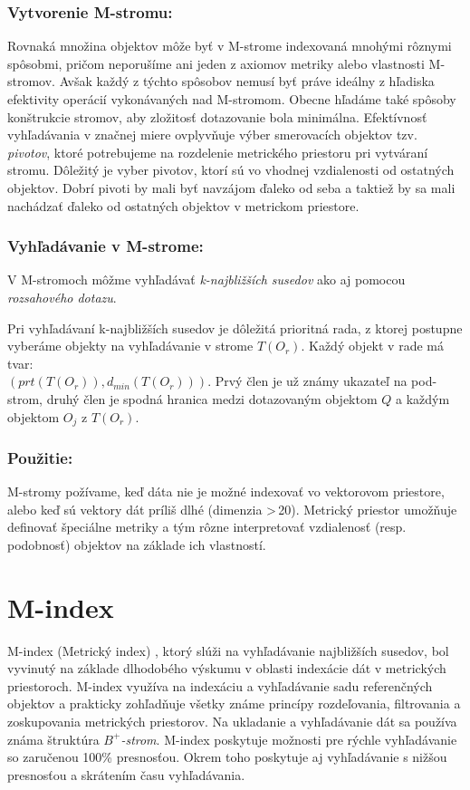 \documentclass[12pt,a4paper,oneside]{fithesis2}
\begin{document}
\subsection{Vytvorenie M-stromu:}
Rovnaká množina objektov môže byť v M-strome indexovaná mnohými rôznymi spôsobmi, pričom neporušíme ani jeden z axiomov metriky alebo vlastnosti M-stromov. Avšak každý z týchto spôsobov nemusí byť práve ideálny z hľadiska efektivity operácií vykonávaných nad M-stromom. Obecne hľadáme také spôsoby konštrukcie stromov, aby zložitosť dotazovanie bola minimálna. Efektívnosť vyhľadávania v značnej miere ovplyvňuje výber smerovacích objektov tzv. \textit{pivotov}, ktoré potrebujeme na rozdelenie metrického priestoru pri vytváraní stromu. Dôležitý je vyber pivotov, ktorí sú vo vhodnej vzdialenosti od ostatných objektov. Dobrí pivoti by mali byť navzájom ďaleko od seba a taktiež by sa mali nachádzať ďaleko od ostatných objektov v metrickom priestore. \\

\subsection{Vyhľadávanie v M-strome:}
V M-stromoch môžme vyhľadávať \textit{k-najbližších susedov} ako aj pomocou \textit{rozsahového dotazu}. 

Pri vyhľadávaní k-najbližších susedov je dôležitá prioritná rada, z ktorej postupne vyberáme objekty na vyhľadávanie v strome $T(O_r)$. Každý objekt v rade má tvar:\\ $(prt(T(O_r)), d_{min}(T(O_r)))$. Prvý člen je už známy ukazateľ na pod-strom, druhý člen je spodná hranica medzi dotazovaným objektom $Q$ a každým objektom $O_j$ z $T(O_r)$.

\subsection{Použitie:}
M-stromy požívame, keď dáta nie je možné indexovať vo vektorovom priestore, alebo keď sú vektory dát príliš dlhé (dimenzia \textgreater \,20). Metrický priestor umožňuje definovať špeciálne metriky a tým rôzne interpretovať vzdialenosť (resp. podobnosť) objektov na základe ich vlastností.

\chapter{M-index}
M-index (Metrický index) \cite{m-index}, ktorý slúži na vyhľadávanie najbližších susedov, bol vyvinutý na základe dlhodobého výskumu v oblasti indexácie dát v metrických priestoroch. M-index využíva na indexáciu a vyhľadávanie sadu referenčných objektov a prakticky zohľadňuje všetky známe princípy rozdeľovania, filtrovania a zoskupovania metrických priestorov. Na ukladanie a vyhľadávanie dát sa používa známa štruktúra $B^+$\textit{-strom}. M-index poskytuje možnosti pre rýchle vyhľadávanie so zaručenou 100\% presnosťou. Okrem toho poskytuje aj vyhľadávanie s nižšou presnosťou a skrátením času vyhľadávania.
\end{document}
